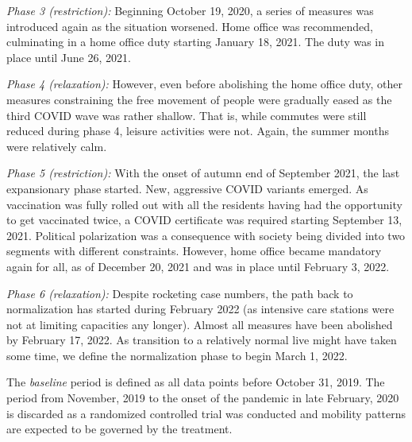 \documentclass[%
    twoside, openright, titlepage, numbers=noenddot,%
    cleardoublepage=empty,%
    abstract=false,%
    BCOR=5.5mm, paper=a5, fontsize=10pt,%
]{mythesis}
\begin{document}
\emph{Phase 3 (restriction):} Beginning October 19, 2020, a series of measures was introduced again as the situation worsened. Home office was recommended, culminating in a home office duty starting January 18, 2021. The duty was in place until June 26, 2021.

\emph{Phase 4 (relaxation):} However, even before abolishing the home office duty, other measures constraining the free movement of people were gradually eased as the third COVID wave was rather shallow. That is, while commutes were still reduced during phase 4, leisure activities were not. Again, the summer months were relatively calm.

\emph{Phase 5 (restriction):} With the onset of autumn end of September 2021, the last expansionary phase started. New, aggressive COVID variants emerged. As vaccination was fully rolled out with all the residents having had the opportunity to get vaccinated twice, a COVID certificate was required starting September 13, 2021. Political polarization was a consequence with society being divided into two segments with different constraints. However, home office became mandatory again for all, as of December 20, 2021 and was in place until February 3, 2022.

\emph{Phase 6 (relaxation):} Despite rocketing case numbers, the path back to normalization has started during February 2022 (as intensive care stations were not at limiting capacities any longer). Almost all measures have been abolished by February 17, 2022. As transition to a relatively normal live might have taken some time, we define the normalization phase to begin March 1, 2022.

The \emph{baseline} period is defined as all data points before October 31, 2019. The period from November, 2019 to the onset of the pandemic in late February, 2020 is discarded as a randomized controlled trial was conducted and mobility patterns are expected to be governed by the treatment.
\end{document}
